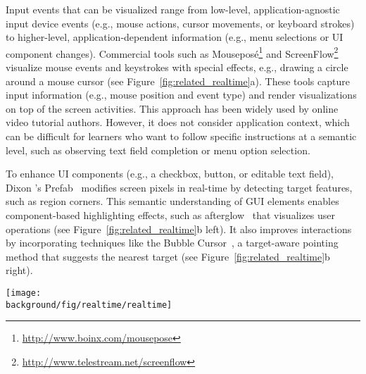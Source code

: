 Input events that can be visualized range from low-level, application-agnostic input device events (e.g., mouse actions, cursor movements, or keyboard strokes) to higher-level, application-dependent information (e.g., menu selections or UI component changes).
%
Commercial tools such as Mouseposé\footnote{\url{http://www.boinx.com/mousepose}} and ScreenFlow\footnote{\url{http://www.telestream.net/screenflow}} visualize mouse events and keystrokes with special effects, e.g., drawing a circle around a mouse cursor (see Figure~\ref{fig:related_realtime}a). These tools capture input information (e.g., mouse position and event type) and render visualizations on top of the screen activities. This approach has been widely used by online video tutorial authors. However, it does not consider application context, which can be difficult for learners who want to follow specific instructions at a semantic level, such as observing text field completion or menu option selection.

To enhance UI components (e.g., a checkbox, button, or editable text field), Dixon \ea{}'s Prefab~\cite{Dixon:2010fb,Dixon:2011:CHP:1978942.1979086} modifies screen pixels in real-time by detecting target features, such as region corners. This semantic understanding of GUI elements enables component-based highlighting effects, such as afterglow~\cite{Baudisch:2006:PET:1166253.1166280} that visualizes user operations (see Figure~\ref{fig:related_realtime}b left). It also improves interactions by incorporating techniques like the Bubble Cursor~\cite{Grossman:2005:BCE:1054972.1055012}, a target-aware pointing method that suggests the nearest target (see Figure~\ref{fig:related_realtime}b right).

\begin{figure*}[t!]
  \centering
  \texttt{[image: \\background/fig/realtime/realtime]}
  \caption{Real-time visual enhancements to GUI applications are commonly used in instructional videos. Mouseposé highlights a mouse cursor (a, left) and displays keyboard input (a, right). Prefab~\cite{Dixon:2010fb} creates effects such as target-agnostic afterglow~\cite{Baudisch:2006:PET:1166253.1166280} (b, left) and target-aware cursor~\cite{Grossman:2005:BCE:1054972.1055012} (b, right) by identifying and reverse engineering UI components.}
  \label{fig:related_realtime}
\end{figure*}

